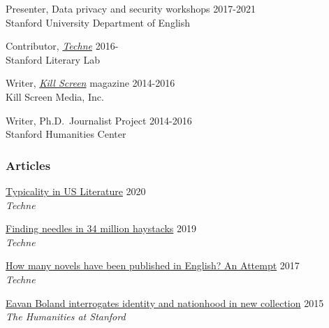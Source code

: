 \documentclass[
  12pt,
  letterpaper,
]{article}
\begin{document}
Presenter, Data privacy and security workshops \hfill 2017-2021\\
\hspace*{0.333em} Stanford University Department of English

Contributor, \href{https://litlab.stanford.edu/techne/}{\emph{Techne}}
\hfill 2016-\\
\hspace*{0.333em} Stanford Literary Lab

Writer, \href{https://web.archive.org/web/20221003115514/https://killscreen.com/previously/author/erik-fredner/}{\emph{Kill Screen}} magazine \hfill 2014-2016\\
\hspace*{0.333em} Kill Screen Media, Inc.

Writer, Ph.D.~Journalist Project \hfill 2014-2016\\
\hspace*{0.333em} Stanford Humanities Center

\hypertarget{articles}{%
\subsubsection{Articles}\label{articles}}

\href{https://web.archive.org/web/20220430165427/https://litlab.stanford.edu/typicality-in-the-u-s-novel/}{Typicality
in US Literature} \hfill 2020\\
\hspace*{0.333em} \emph{Techne}

\href{https://web.archive.org/web/20220430054802/https://litlab.stanford.edu/finding-needles-in-34-million-haystacks/}{Finding
needles in 34 million haystacks} \hfill 2019\\
\hspace*{0.333em} \emph{Techne}

\href{https://web.archive.org/web/20220323072937/https://litlab.stanford.edu/how-many-novels-have-been-published-in-english-an-attempt/}{How
many novels have been published in English? An Attempt} \hfill 2017\\
\hspace*{0.333em} \emph{Techne}

\href{https://web.archive.org/web/20210810123746/https://news.stanford.edu/news/2015/february/boland-country-book-022615.html}{Eavan
Boland interrogates identity and nationhood in new collection}
\hfill 2015\\
\hspace*{0.333em} \emph{The Humanities at Stanford}
\end{document}

